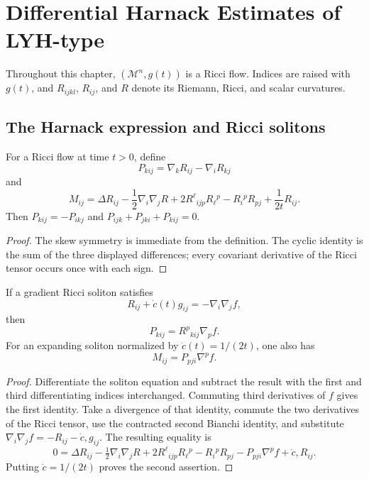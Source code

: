 \chapter{Differential Harnack Estimates of LYH-type}
\label{ch:chow-ii-differential-harnack-estimates}

Throughout this chapter, \((\mathcal M^n,g(t))\) is a Ricci flow.  Indices are
raised with \(g(t)\), and \(R_{ijkl}\), \(R_{ij}\), and \(R\) denote its
Riemann, Ricci, and scalar curvatures.

\section{The Harnack expression and Ricci solitons}

\begin{definition}
\label{def:chow-ii-harnack-p-and-m-tensors}
For a Ricci flow at time \(t>0\), define
\[
P_{kij}=\nabla_kR_{ij}-\nabla_iR_{kj}
\]
and
\[
M_{ij}=\Delta R_{ij}-\frac12\nabla_i\nabla_jR
 +2R^{\ell}{}_{ijp}R_{\ell}{}^p-R_i{}^pR_{pj}+\frac1{2t}R_{ij}.
\]
Then \(P_{kij}=-P_{ikj}\) and
\(P_{ijk}+P_{jki}+P_{kij}=0\).
\end{definition}
\begin{proof}
The skew symmetry is immediate from the definition.  The cyclic identity is
the sum of the three displayed differences; every covariant derivative of the
Ricci tensor occurs once with each sign.
\end{proof}

\begin{lemma}
\label{lem:chow-ii-soliton-harnack-identities}
If a gradient Ricci soliton satisfies
\[
R_{ij}+\dot c(t)g_{ij}=-\nabla_i\nabla_jf,
\]
then
\[
P_{kij}=R^p{}_{kij}\nabla_pf.
\]
For an expanding soliton normalized by \(\dot c(t)=1/(2t)\), one also has
\[
M_{ij}=P_{pji}\nabla^pf.
\]
\end{lemma}
\begin{proof}
Differentiate the soliton equation and subtract the result with the first and
third differentiating indices interchanged.  Commuting third derivatives of
\(f\) gives the first identity.  Take a divergence of that identity, commute
the two derivatives of the Ricci tensor, use the contracted second Bianchi
identity, and substitute
\(\nabla_i\nabla_jf=-R_{ij}-\dot c,g_{ij}\).  The resulting equality is
\[
0=\Delta R_{ij}-\tfrac12\nabla_i\nabla_jR
 +2R^\ell{}_{ijp}R_\ell{}^p-R_i{}^pR_{pj}
-P_{pji}\nabla^pf+\dot c,R_{ij}.
\]
Putting \(\dot c=1/(2t)\) proves the second assertion.
\end{proof}

